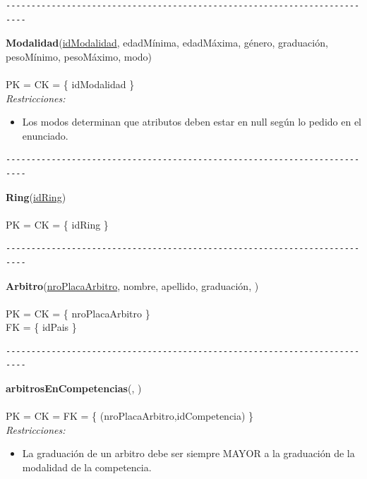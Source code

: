 \begin{verbatim}
--------------------------------------------------------------------------
\end{verbatim}

\noindent\textbf{Modalidad}(\uline{idModalidad}, edadMínima, edadMáxima, género, graduación, pesoMínimo, pesoMáximo, modo)
\\
\\
PK = CK = \{ idModalidad \} \\
\textit{Restricciones:}
\begin{itemize}
	\item Los modos determinan que atributos deben estar en null según lo pedido en el enunciado.
\end{itemize}


\begin{verbatim}
--------------------------------------------------------------------------
\end{verbatim}

\noindent\textbf{Ring}(\uline{idRing})
\\
\\
PK = CK = \{ idRing \} \\

\begin{verbatim}
--------------------------------------------------------------------------
\end{verbatim}

\noindent\textbf{Arbitro}(\uline{nroPlacaArbitro}, nombre, apellido, graduación, )
\\
\\
PK = CK = \{ nroPlacaArbitro \} \\
FK = \{ idPais \} \\

\begin{verbatim}
--------------------------------------------------------------------------
\end{verbatim}

\noindent\textbf{arbitrosEnCompetencias}(, )
\\
\\
PK = CK = FK = \{ (nroPlacaArbitro,idCompetencia) \} \\

\textit{Restricciones:}
\begin{itemize}
	\item La graduación de un arbitro debe ser siempre MAYOR a la graduación de la modalidad de la competencia.
\end{itemize}

